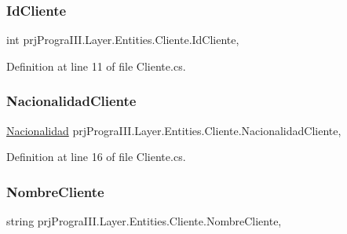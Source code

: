 \subsubsection{\texorpdfstring{Id\+Cliente}{IdCliente}}
{\footnotesize\ttfamily int prj\+Progra\+I\+I\+I.\+Layer.\+Entities.\+Cliente.\+Id\+Cliente\hspace{0.3cm}{\ttfamily [get]}, {\ttfamily [set]}}



Definition at line 11 of file Cliente.\+cs.

\hypertarget{classprj_progra_i_i_i_1_1_layer_1_1_entities_1_1_cliente_a344360f96a769c3e003ebdceb382bd61}{}\label{classprj_progra_i_i_i_1_1_layer_1_1_entities_1_1_cliente_a344360f96a769c3e003ebdceb382bd61} 
\subsubsection{\texorpdfstring{Nacionalidad\+Cliente}{NacionalidadCliente}}
{\footnotesize\ttfamily \hyperlink{classprj_progra_i_i_i_1_1_layer_1_1_entities_1_1_nacionalidad}{Nacionalidad} prj\+Progra\+I\+I\+I.\+Layer.\+Entities.\+Cliente.\+Nacionalidad\+Cliente\hspace{0.3cm}{\ttfamily [get]}, {\ttfamily [set]}}



Definition at line 16 of file Cliente.\+cs.

\hypertarget{classprj_progra_i_i_i_1_1_layer_1_1_entities_1_1_cliente_a4f1af902b5c286d6fd1105c6dd9e3836}{}\label{classprj_progra_i_i_i_1_1_layer_1_1_entities_1_1_cliente_a4f1af902b5c286d6fd1105c6dd9e3836} 
\subsubsection{\texorpdfstring{Nombre\+Cliente}{NombreCliente}}
{\footnotesize\ttfamily string prj\+Progra\+I\+I\+I.\+Layer.\+Entities.\+Cliente.\+Nombre\+Cliente\hspace{0.3cm}{\ttfamily [get]}, {\ttfamily [set]}}



